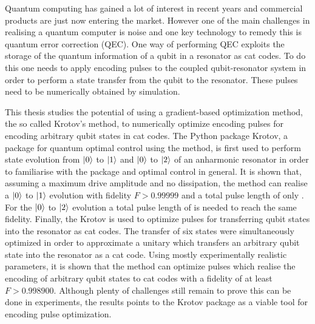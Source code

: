 \documentclass[main.tex]{subfiles}
\begin{document}
Quantum computing has gained a lot of interest in recent years and commercial products are just now entering the market.
However one of the main challenges in realising a quantum computer is noise and one key technology to remedy this is quantum error correction (QEC).
One way of performing QEC exploits the storage of the quantum information of a qubit in a resonator as cat codes.
To do this one needs to apply encoding pulses to the coupled qubit-resonator system in order to perform a state transfer from the qubit to the resonator.
These pulses need to be numerically obtained by simulation.

This thesis studies the potential of using a gradient-based optimization method, the so called Krotov's method, to numerically optimize encoding pulses for encoding arbitrary qubit states in cat codes.
The Python package Krotov, a package for quantum optimal control using the method, is first used to perform state evolution from \(\ket{0}\) to \(\ket{1}\) and \(\ket{0}\) to \(\ket{2}\) of an anharmonic resonator in order to familiarise with the package and optimal control in general.
It is shown that, assuming a maximum drive amplitude and no dissipation, the method can realise a \(\ket{0}\) to \(\ket{1}\) evolution with fidelity \( F > 0.99999\) and a total pulse length of only .
For the \(\ket{0}\) to \(\ket{2}\) evolution a total pulse length of  is needed to reach the same fidelity.
Finally, the Krotov is used to optimize pulses for transferring qubit states into the resonator as cat codes.
The transfer of six states were simultaneously optimized in order to approximate a unitary which transfers an arbitrary qubit state into the resonator as a cat code.
Using mostly experimentally realistic parameters, it is shown that the method can optimize pulses which realise the encoding of arbitrary qubit states to cat codes with a fidelity of at least \( F > 0.998900\).
Although plenty of challenges still remain to prove this can be done in experiments, the results points to the Krotov package as a viable tool for encoding pulse optimization.
\end{document}
